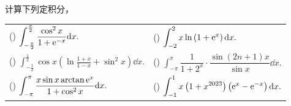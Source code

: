 \begin{example}
    计算下列定积分，
    \setcounter{magicrownumbers}{0}
    \begin{table}[H]
        \centering
        \begin{tabular}{l | l}
            (\rownumber{}) $\displaystyle\int_{-\frac{\pi}{2}}^{\frac{\pi}{2}}\frac{\cos^2x}{1+\mathrm{e} ^{-x}}\dd x.$                & (\rownumber{}) $\displaystyle\int_{-2}^2x\ln\left(1+\mathrm{e} ^x\right)\dd x.$                               \\
            (\rownumber{}) $\displaystyle\int_{-\frac{1}{2}}^{\frac{1}{2}}\cos x\left(\ln\frac{1+x}{1-x}+\sin^2x\right)\dd x.$ & (\rownumber{}) $\displaystyle\int_{-\pi}^{\pi}\dfrac{1}{1+2^x}\cdot\dfrac{\sin(2n+1)x}{\sin x}\dd x.$ \\
            (\rownumber{}) $\displaystyle\int_{-\pi}^{\pi}\frac{x\sin x\arctan\mathrm{e} ^x}{1+\cos^2x}\dd x.$                         & (\rownumber{}) $\displaystyle\int_{-1}^1x\left(1+x^{2023}\right)\left(\mathrm{e} ^x-\mathrm{e} ^{-x}\right)\dd x.$
        \end{tabular}
    \end{table}
\end{example}
